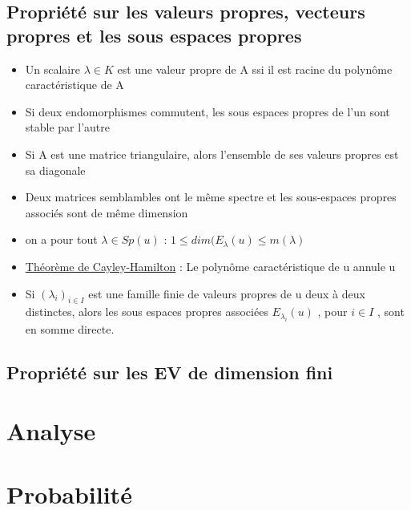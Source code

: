 \documentclass{article}
\begin{document}
\subsection{Propriété sur les valeurs propres, vecteurs propres et les sous espaces propres}
\begin{itemize}[label=$\ast$]
	\item Un scalaire \( \lambda \in K \) est une valeur propre de A ssi il est racine du polynôme caractéristique de A
	\item Si deux endomorphismes commutent, les sous espaces propres de l'un sont stable par l'autre
	\item Si A est une matrice triangulaire, alors l'ensemble de ses valeurs propres est sa diagonale
	\item Deux matrices semblambles ont le même spectre et les sous-espaces propres associés sont de même dimension
	\item on a pour tout \( \lambda \in Sp(u) \) : \( 1 \leq dim(E_{\lambda}(u) \leq m(\lambda) \)
	\item \underline{Théorème de Cayley-Hamilton} : Le polynôme caractéristique de u annule u
	\item Si \( (\lambda_i)_{i \in I} \) est une famille finie de valeurs propres de u deux à deux distinctes, alors les sous espaces propres associées \(E_{\lambda_{i}}(u)\) , pour \(i \in I \) , sont en somme directe.
\end{itemize}

\subsection{Propriété sur les EV de dimension fini}

\section{Analyse}

\section{Probabilité}
\end{document}
